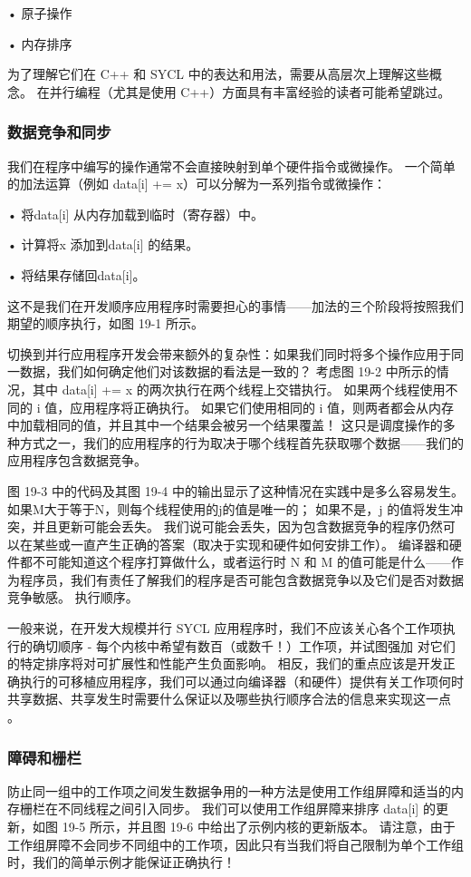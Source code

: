 • 原子操作

• 内存排序

为了理解它们在 C++ 和 SYCL 中的表达和用法，需要从高层次上理解这些概念。 在并行编程（尤其是使用 C++）方面具有丰富经验的读者可能希望跳过。

\subsubsection{数据竞争和同步}
我们在程序中编写的操作通常不会直接映射到单个硬件指令或微操作。 一个简单的加法运算（例如 data[i] += x）可以分解为一系列指令或微操作：

• 将data[i] 从内存加载到临时（寄存器）中。

• 计算将x 添加到data[i] 的结果。

• 将结果存储回data[i]。

这不是我们在开发顺序应用程序时需要担心的事情——加法的三个阶段将按照我们期望的顺序执行，如图 19-1 所示。

切换到并行应用程序开发会带来额外的复杂性：如果我们同时将多个操作应用于同一数据，我们如何确定他们对该数据的看法是一致的？ 考虑图 19-2 中所示的情况，其中 data[i] += x 的两次执行在两个线程上交错执行。 如果两个线程使用不同的 i 值，应用程序将正确执行。 如果它们使用相同的 i 值，则两者都会从内存中加载相同的值，并且其中一个结果会被另一个结果覆盖！ 这只是调度操作的多种方式之一，我们的应用程序的行为取决于哪个线程首先获取哪个数据——我们的应用程序包含数据竞争。

图 19-3 中的代码及其图 19-4 中的输出显示了这种情况在实践中是多么容易发生。 如果M大于等于N，则每个线程使用的j的值是唯一的； 如果不是，j 的值将发生冲突，并且更新可能会丢失。 我们说可能会丢失，因为包含数据竞争的程序仍然可以在某些或一直产生正确的答案（取决于实现和硬件如何安排工作）。 编译器和硬件都不可能知道这个程序打算做什么，或者运行时 N 和 M 的值可能是什么——作为程序员，我们有责任了解我们的程序是否可能包含数据竞争以及它们是否对数据竞争敏感。 执行顺序。

一般来说，在开发大规模并行 SYCL 应用程序时，我们不应该关心各个工作项执行的确切顺序 - 每个内核中希望有数百（或数千！）工作项，并试图强加 对它们的特定排序将对可扩展性和性能产生负面影响。 相反，我们的重点应该是开发正确执行的可移植应用程序，我们可以通过向编译器（和硬件）提供有关工作项何时共享数据、共享发生时需要什么保证以及哪些执行顺序合法的信息来实现这一点 。

\subsubsection{障碍和栅栏}
防止同一组中的工作项之间发生数据争用的一种方法是使用工作组屏障和适当的内存栅栏在不同线程之间引入同步。 我们可以使用工作组屏障来排序 data[i] 的更新，如图 19-5 所示，并且图 19-6 中给出了示例内核的更新版本。 请注意，由于工作组屏障不会同步不同组中的工作项，因此只有当我们将自己限制为单个工作组时，我们的简单示例才能保证正确执行！

